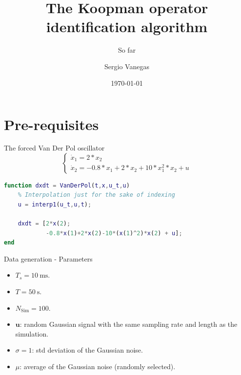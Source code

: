\documentclass{beamer}
\title[Process]{The Koopman operator identification algorithm}
\subtitle{So far}
\institute[Polimi]{Politecnico di Milano}
\author{Sergio Vanegas}
\date{\today}
\begin{document}
\begin{frame}
    \maketitle
\end{frame}


\section{Pre-requisites}

\begin{frame}[fragile]{The forced Van Der Pol oscillator}
    \begin{equation}
        \begin{cases}
            \dot{x}_1 = 2*x_2 \\
            \dot{x}_2 = -0.8*x_1 + 2*x_2 + 10*x_1^2*x_2 + u
        \end{cases}
    \end{equation}

    \begin{lstlisting}[language=Matlab]
function dxdt = VanDerPol(t,x,u_t,u)
    % Interpolation just for the sake of indexing
    u = interp1(u_t,u,t);

    dxdt = [2*x(2);
            -0.8*x(1)+2*x(2)-10*(x(1)^2)*x(2) + u];
end
    \end{lstlisting}
\end{frame}

\begin{frame}{Data generation - Parameters}
    \begin{itemize}
        \item $T_s = \SI{10}{\milli \second}$.
        \item $T = \SI{50}{\second}$.
        \item $N_\text{Sim} = \num{100}$.
        \item $\textbf{u}$: random Gaussian signal with the same sampling rate and length as the simulation.
        \item $\sigma = 1$: std deviation of the Gaussian noise.
        \item $\mu$: average of the Gaussian noise (randomly selected).
    \end{itemize}
\end{frame}
\end{document}
